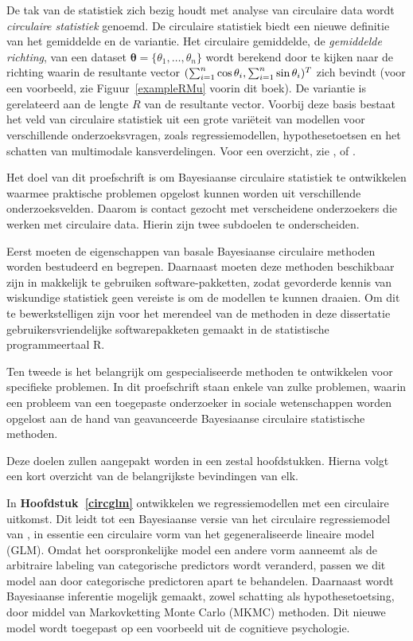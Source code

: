 \documentclass[12pt, a4paper]{book}\usepackage[]{graphicx}\usepackage[]{color}
\let\proglang=\textsf
\begin{document}
De tak van de statistiek zich bezig houdt met analyse van circulaire data wordt \textit{circulaire statistiek} genoemd. De circulaire statistiek biedt een nieuwe definitie van het gemiddelde en de variantie. Het circulaire gemiddelde, de \textit{gemiddelde richting}, van een dataset $\boldsymbol{\theta} = \{\theta_1, \dots, \theta_n\}$ wordt berekend door te kijken naar de richting waarin de resultante vector $(\sum_{i=1}^n\cos\theta_i, \sum_{i=1}^n\sin\theta_i)^T$ zich bevindt (voor een voorbeeld, zie Figuur~\ref{exampleRMu} voorin dit boek). De variantie is gerelateerd aan de lengte $R$ van de resultante vector. Voorbij deze basis bestaat het veld van circulaire statistiek uit een grote vari\"eteit van modellen voor verschillende onderzoeksvragen, zoals regressiemodellen, hypothesetoetsen en het schatten van multimodale kansverdelingen. Voor een overzicht, zie \citet{fisher1995statistical}, \citet{mardia2009directional} of \citet{pewsey2013circular}.

Het doel van dit proefschrift is om Bayesiaanse circulaire statistiek te ontwikkelen waarmee praktische problemen opgelost kunnen worden uit verschillende onderzoeksvelden. Daarom is contact gezocht met verscheidene onderzoekers die werken met circulaire data. Hierin zijn twee subdoelen te onderscheiden.

Eerst moeten de eigenschappen van basale Bayesiaanse circulaire methoden worden bestudeerd en begrepen. Daarnaast moeten deze methoden beschikbaar zijn in makkelijk te gebruiken software-pakketten, zodat gevorderde  kennis van wiskundige statistiek geen vereiste is om de modellen te kunnen draaien. Om dit te bewerkstelligen zijn voor het merendeel van de methoden in deze dissertatie gebruikersvriendelijke softwarepakketen gemaakt in de statistische programmeertaal \proglang{R}.

Ten tweede is het belangrijk om gespecialiseerde methoden te ontwikkelen voor specifieke problemen. In dit proefschrift staan enkele van zulke problemen, waarin een probleem van een toegepaste onderzoeker in sociale wetenschappen worden opgelost aan de hand van geavanceerde Bayesiaanse circulaire statistische methoden.

Deze doelen zullen aangepakt worden in een zestal hoofdstukken. Hierna volgt een kort overzicht van de belangrijkste bevindingen van elk.

In \textbf{Hoofdstuk~\ref{circglm}} ontwikkelen we regressiemodellen met een circulaire uitkomst. Dit leidt tot een Bayesiaanse versie van het circulaire regressiemodel van \citet{fisher1992regression}, in essentie een circulaire vorm van het gegeneraliseerde lineaire model (GLM). Omdat het oorspronkelijke model een andere vorm aanneemt als de arbitraire labeling van categorische predictors wordt veranderd, passen we dit model aan door categorische predictoren apart te behandelen. Daarnaast wordt Bayesiaanse inferentie mogelijk gemaakt, zowel schatting als hypothesetoetsing, door middel van Markovketting Monte Carlo (MKMC) methoden. Dit nieuwe model wordt toegepast op een voorbeeld uit de cognitieve psychologie.
\end{document}
